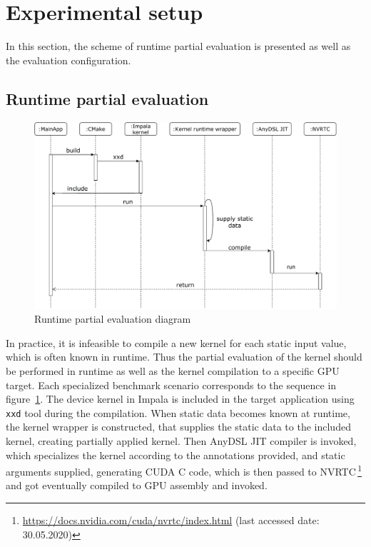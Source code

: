 \section{Experimental setup}
In this section, the scheme of runtime partial evaluation is presented as well as the evaluation configuration.

\subsection{Runtime partial evaluation}

\begin{figure}[b!]
    \centering
    \includegraphics[width=\linewidth]{figures/SeqDiagram.pdf}
    \caption{Runtime partial evaluation diagram}
    \label{fig:seq_pe}
\end{figure}

In practice, it is infeasible to compile a new kernel for each static input value, which is often known in runtime. Thus the partial evaluation of the kernel should be performed in runtime as well as the kernel compilation to a specific GPU target.
Each specialized benchmark scenario corresponds to the sequence in figure~\ref{fig:seq_pe}. The device kernel in Impala is included in the target application using \lstinline{xxd} tool during the compilation. When static data becomes known at runtime, the kernel wrapper is constructed, that supplies the static data to the included kernel, creating partially applied kernel. Then AnyDSL JIT compiler is invoked, which specializes the kernel according to the annotations provided, and static arguments supplied, generating CUDA C code, which is then passed to NVRTC\,\footnote{\url{https://docs.nvidia.com/cuda/nvrtc/index.html} (last accessed date: 30.05.2020)} and got eventually compiled to GPU assembly and invoked.

